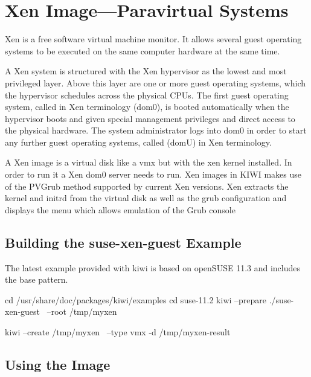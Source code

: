 \chapter{Xen Image---Paravirtual Systems}
\label{chapter:xen}
\minitoc

Xen is a free software virtual machine monitor. It allows several
guest operating systems to be executed on the same computer hardware
at the same time.

A Xen system is structured with the Xen hypervisor as the lowest and
most privileged layer.%
Above this layer are one or more guest
operating systems, which the hypervisor schedules across the physical
CPUs. The first guest operating system, called in Xen terminology
 (dom0), is booted automatically when the hypervisor boots
and given special management privileges and direct access to the physical
hardware. The system administrator logs into dom0 in order to start
any further guest operating systems, called  (domU) in
Xen terminology.

A Xen image is a virtual disk like a vmx but with the xen kernel
installed. In order to run it a Xen dom0 server needs to run. Xen
images in KIWI makes use of the PVGrub method supported by current
Xen versions. Xen extracts the kernel and initrd from the virtual
disk as well as the grub configuration and displays the menu which
allows emulation of the Grub console

\section{Building the suse-xen-guest Example}

The latest example provided with kiwi is based on openSUSE 11.3 and includes
the base pattern. 

\begin{Command}{12cm}
cd /usr/share/doc/packages/kiwi/examples
cd suse-11.2
kiwi --prepare ./suse-xen-guest \
     --root /tmp/myxen
\end{Command}

\begin{Command}{12cm}
kiwi --create /tmp/myxen \
     --type vmx -d /tmp/myxen-result
\end{Command}

\section{Using the Image}

